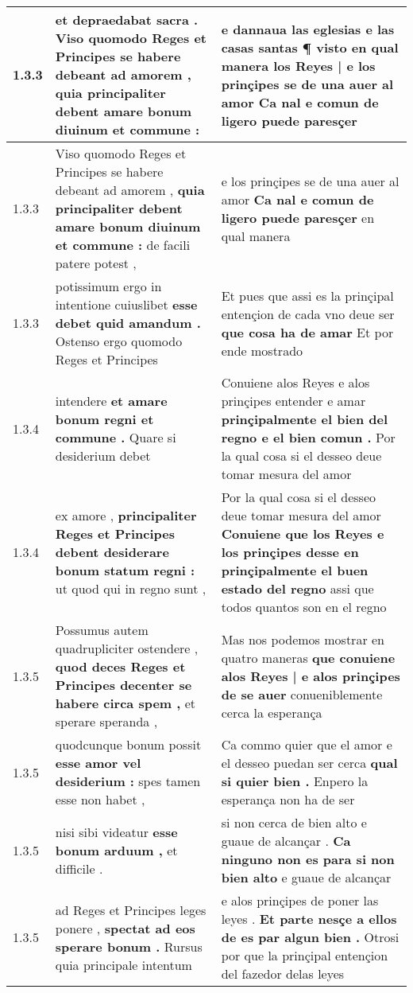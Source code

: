 \begin{tabular}{|p{1cm}|p{6.5cm}|p{6.5cm}|}
1.3.3 & et depraedabat sacra . \textbf{ Viso quomodo Reges et Principes se habere debeant ad amorem , } quia principaliter debent amare bonum diuinum et commune : & e dannaua las eglesias e las casas santas \textbf{ ¶ visto en qual manera los Reyes | e los prinçipes se de una auer al amor } Ca nal e comun de ligero puede paresçer \\\hline
1.3.3 & Viso quomodo Reges et Principes se habere debeant ad amorem , \textbf{ quia principaliter debent amare bonum diuinum et commune : } de facili patere potest , & e los prinçipes se de una auer al amor \textbf{ Ca nal e comun de ligero puede paresçer } en qual manera \\\hline
1.3.3 & potissimum ergo in intentione cuiuslibet \textbf{ esse debet quid amandum . } Ostenso ergo quomodo Reges et Principes & Et pues que assi es la prinçipal entençion de cada vno deue ser \textbf{ que cosa ha de amar } Et por ende mostrado \\\hline
1.3.4 & intendere \textbf{ et amare bonum regni et commune . } Quare si desiderium debet & Conuiene alos Reyes e alos prinçipes entender e amar \textbf{ prinçipalmente el bien del regno e el bien comun . } Por la qual cosa si el desseo deue tomar mesura del amor \\\hline
1.3.4 & ex amore , \textbf{ principaliter Reges et Principes debent desiderare bonum statum regni : } ut quod qui in regno sunt , & Por la qual cosa si el desseo deue tomar mesura del amor \textbf{ Conuiene que los Reyes e los prinçipes desse en prinçipalmente el buen estado del regno } assi que todos quantos son en el regno \\\hline
1.3.5 & Possumus autem quadrupliciter ostendere , \textbf{ quod deces Reges et Principes decenter se habere circa spem , } et sperare speranda , & Mas nos podemos mostrar en quatro maneras \textbf{ que conuiene alos Reyes | e alos prinçipes de se auer } conueniblemente cerca la esperança \\\hline
1.3.5 & quodcunque bonum possit \textbf{ esse amor vel desiderium : } spes tamen esse non habet , & Ca commo quier que el amor e el desseo puedan ser cerca \textbf{ qual si quier bien . } Enpero la esperança non ha de ser \\\hline
1.3.5 & nisi sibi videatur \textbf{ esse bonum arduum , } et difficile . & si non cerca de bien alto e guaue de alcançar . \textbf{ Ca ninguno non es para si non bien alto } e guaue de alcançar \\\hline
1.3.5 & ad Reges et Principes leges ponere , \textbf{ spectat ad eos sperare bonum . } Rursus quia principale intentum & e alos prinçipes de poner las leyes . \textbf{ Et parte nesçe a ellos de es par algun bien . } Otrosi por que la prinçipal entençion del fazedor delas leyes \\\hline

\end{tabular}
